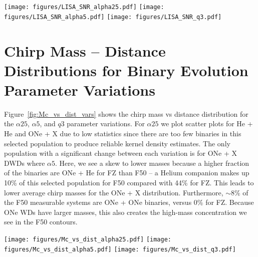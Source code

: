 \documentclass[twocolumn, linenumbers]{aastex631}
\begin{document}
\begin{figure*}[h]
    \centering
	\texttt{[image: figures/LISA\_SNR\_alpha25.pdf]}
	\texttt{[image: figures/LISA\_SNR\_alpha5.pdf]}
	\texttt{[image: figures/LISA\_SNR\_q3.pdf]}
    \caption{The ASD vs GW frequency for DWDs resolved with SNR $> 7$ for each DWD type and parameter variation. The rows alternate between model F50 and from model FZ. In each panel, the LISA sensitivity curve, including the confusion foreground for each model, is shown in black and the total population for each model is shown in grey. Again, we find that each model qualitatively exhibits similar characteristics and that the only change is in the yield of resolved DWDs for each type based on the strength of the confusion foreground.}
    \label{fig:LISA_SNR_vars}

\end{figure*}

\section{Chirp Mass -- Distance Distributions for Binary Evolution Parameter Variations}\label{appendix:Mc_dist_vars}

Figure~\ref{fig:Mc_vs_dist_vars} shows the chirp mass vs distance distribution for the $\alpha25$, $\alpha5$, and $q3$ parameter variations. For $\alpha25$ we plot scatter plots for He + He and ONe + X due to low statistics since there are too few binaries in this selected population to produce reliable kernel density estimates. The only population with a significant change between each variation is for ONe + X DWDs where $\alpha5$. Here, we see a skew to lower masses because a higher fraction of the binaries are ONe + He for FZ than F50 -- a Helium companion makes up 10\% of this selected population for F50 compared with 44\% for FZ. This leads to lower average chirp masses for the ONe + X distribution. Furthermore, $\sim8$\% of the F50 measurable systems are ONe + ONe binaries, versus 0\% for FZ. Because ONe WDs have larger masses, this also creates the high-mass concentration we see in the F50 contours.
\begin{figure*}[h]
    \centering
	\texttt{[image: figures/Mc\_vs\_dist\_alpha25.pdf]}
	\texttt{[image: figures/Mc\_vs\_dist\_alpha5.pdf]}
	\texttt{[image: figures/Mc\_vs\_dist\_q3.pdf]}
    \caption{Chirp mass -- distance distributions for our other three binary evolution parameter variations. We plot the $\alpha25$ populations of He + He and ONe + X DWDs as scatter points since there are too few binaries to produce meaningful density distributions. Again, we have plotted each DWD type's population that exhibit observable GW frequency evolution and have SNR$>7$. Contours show the 5$^{\rm{th}}$, 25$^{\rm{th}}$, 50$^{\rm{th}}$, 75$^{\rm{th}}$ and 95$^{\rm{th}}$ percentiles. Most populations remain unchanged between binary fraction models except for ONe + X DWDs in $\alpha5$, due to the number of He vs. CO vs. ONe companions between each model.}
    \label{fig:Mc_vs_dist_vars}
\end{figure*}
\end{document}
